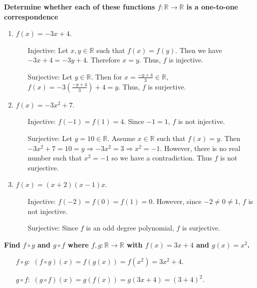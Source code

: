 \documentclass[letterpaper, 12pt]{article}
\begin{document}
\noindent\textbf{Determine whether each of these functions $f:\mathbb{R}\rightarrow\mathbb{R}$ is a one-to-one correspondence}
\begin{enumerate}
    \item $f(x) = -3x + 4$.
    \begin{itemize}
        \item[Injective:]  Let $x,y\in\mathbb{R}$ such that $f(x) = f(y)$. Then we have $-3x + 4 = -3y + 4$. Therefore $x = y$. Thus, $f$ is injective.
        
        \item[Surjective:] Let $y\in\mathbb{R}$. Then for $x = \frac{-y+4}{3}\in\mathbb{R}$, $f(x) = -3(\frac{-y + 4}{3}) + 4 = y$. Thus, $f$ is surjective.
    \end{itemize}
    
    \item $f(x) = -3x^2 + 7$.
    \begin{itemize}
        \item[Injective:]  $f(-1) = f(1) = 4$. Since $-1=1$, $f$ is not injective.
        
        \item[Surjective:] Let $y = 10 \in\mathbb{R}.$ Assume $x\in\mathbb{R}$ such that $f(x) = y$. Then $-3x^2 + 7 = 10 = y \Rightarrow -3x^2 = 3 \Rightarrow x^2 = -1$. However, there is no real number such that $x^2 = -1$ so we have a contradiction. Thus $f$ is not surjective.
    \end{itemize}
    
    \item $f(x) = (x + 2)(x - 1)x$.
    \begin{itemize}
        \item[Injective:]  $f(-2) = f(0) = f(1) = 0$. However, since $ -2 \not= 0 \not= 1$, $f$ is not injective.
        
        \item[Surjective:] Since $f$ is an odd degree polynomial, $f$ is surjective.
    \end{itemize}
\end{enumerate}

\noindent\textbf{Find $f\circ g$ and $g \circ f$ where $f,g:\mathbb{R}\rightarrow\mathbb{R}$ with $f(x) = 3x + 4$ and $g(x) = x^2$.}
\begin{itemize}
    \item[$f \circ g:$] $(f \circ g)(x) = f(g(x)) = f(x^2) = 3x^2 + 4$.
    \item[$g \circ f:$] $(g \circ f)(x) = g(f(x)) = g(3x + 4) = (3 + 4)^2$.
\end{itemize}
\end{document}
